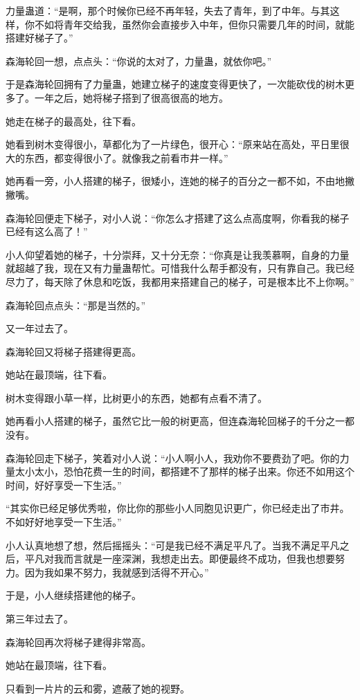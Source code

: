 \begin{this_body}
力量蛊道：“是啊，那个时候你已经不再年轻，失去了青年，到了中年。与其这样，你不如将青年交给我，虽然你会直接步入中年，但你只需要几年的时间，就能搭建好梯子了。”

森海轮回一想，点点头：“你说的太对了，力量蛊，就依你吧。”

于是森海轮回拥有了力量蛊，她建立梯子的速度变得更快了，一次能砍伐的树木更多了。一年之后，她将梯子搭到了很高很高的地方。

她走在梯子的最高处，往下看。

她看到树木变得很小，草都化为了一片绿色，很开心：“原来站在高处，平日里很大的东西，都变得很小了。就像我之前看市井一样。”

她再看一旁，小人搭建的梯子，很矮小，连她的梯子的百分之一都不如，不由地撇撇嘴。

森海轮回便走下梯子，对小人说：“你怎么才搭建了这么点高度啊，你看我的梯子已经有这么高了！”

小人仰望着她的梯子，十分崇拜，又十分无奈：“你真是让我羡慕啊，自身的力量就超越了我，现在又有力量蛊帮忙。可惜我什么帮手都没有，只有靠自己。我已经尽力了，每天除了休息和吃饭，我都用来搭建自己的梯子，可是根本比不上你啊。”

森海轮回点点头：“那是当然的。”

又一年过去了。

森海轮回又将梯子搭建得更高。

她站在最顶端，往下看。

树木变得跟小草一样，比树更小的东西，她都有点看不清了。

她再看小人搭建的梯子，虽然它比一般的树更高，但连森海轮回梯子的千分之一都没有。

森海轮回走下梯子，笑着对小人说：“小人啊小人，我劝你不要费劲了吧。你的力量太小太小，恐怕花费一生的时间，都搭建不了那样的梯子出来。你还不如用这个时间，好好享受一下生活。”

“其实你已经足够优秀啦，你比你的那些小人同胞见识更广，你已经走出了市井。不如好好地享受一下生活。”

小人认真地想了想，然后摇摇头：“可是我已经不满足平凡了。当我不满足平凡之后，平凡对我而言就是一座深渊，我想走出去。即便最终不成功，但我也想要努力。因为我如果不努力，我就感到活得不开心。”

于是，小人继续搭建他的梯子。

第三年过去了。

森海轮回再次将梯子建得非常高。

她站在最顶端，往下看。

只看到一片片的云和雾，遮蔽了她的视野。


\end{this_body}

